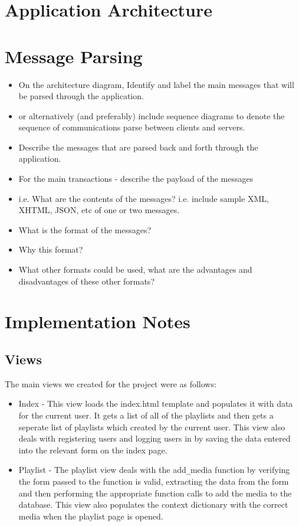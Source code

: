 \documentclass{sig-alt-release2}
\begin{document}
\section{Application Architecture}



\section{Message Parsing}
\begin{itemize}

\item	On the architecture diagram, Identify and label the main messages that will be parsed through the application.
\item	or alternatively (and preferably) include sequence diagrams to denote the sequence of communications parse between clients and servers.
\item	Describe the messages that are parsed back and forth through the application.
\item	For the main transactions - describe the payload of the messages 
\item	i.e. What are the contents of the messages? i.e. include sample XML, XHTML, JSON, etc of one or two messages.
\item	What is the format of the messages? 
\item	Why this format? 
\item	What other formats could be used, what are the advantages and disadvantages of these other formats?
\end{itemize}


\section{Implementation Notes}

\subsection{Views}

The main views we created for the project were as follows:

\begin{itemize}
\item Index - This view loads the index.html template and populates it with data for the current user. It gets a list of all of the playlists and then gets a seperate list of playlists which created by the current user. This view also deals with registering users and logging users in by saving the data entered into the relevant form on the index page.
\item Playlist - The playlist view deals with the add\verb=_=media function by verifying the form passed to the function is valid, extracting the data from the form and then performing the appropriate function calls to add the media to the database. This view also populates the context dictionary with the correct media when the playlist page is opened.
\end{itemize}
\end{document}
